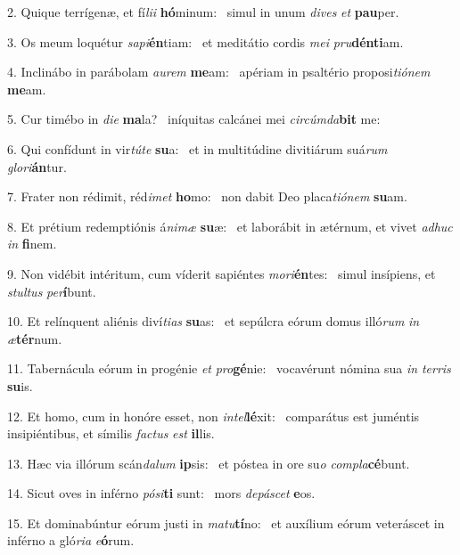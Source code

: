 2. Quique terrígenæ, et fí\textit{li}\textit{i} \textbf{hó}minum: \ast\  simul in unum \textit{di}\textit{ves} \textit{et} \textbf{pau}per.\

3. Os meum loquétur \textit{sa}\textit{pi}\textbf{én}tiam: \ast\  et meditátio cordis \textit{me}\textit{i} \textit{pru}\textbf{dén}\textbf{ti}am.\

4. Inclinábo in parábolam \textit{au}\textit{rem} \textbf{me}am: \ast\  apériam in psaltério proposi\textit{ti}\textit{ó}\textit{nem} \textbf{me}am.\

5. Cur timébo in \textit{di}\textit{e} \textbf{ma}la? \ast\  iníquitas calcánei mei \textit{cir}\textit{cúm}\textit{da}\textbf{bit} me:\

6. Qui confídunt in vir\textit{tú}\textit{te} \textbf{su}a: \ast\  et in multitúdine divitiárum suá\textit{rum} \textit{glo}\textit{ri}\textbf{án}tur.\

7. Frater non rédimit, réd\textit{i}\textit{met} \textbf{ho}mo: \ast\  non dabit Deo placa\textit{ti}\textit{ó}\textit{nem} \textbf{su}am.\

8. Et prétium redemptiónis á\textit{ni}\textit{mæ} \textbf{su}æ: \ast\  et laborábit in ætérnum, et vivet \textit{ad}\textit{huc} \textit{in} \textbf{fi}nem.\

9. Non vidébit intéritum, cum víderit sapiéntes \textit{mo}\textit{ri}\textbf{én}tes: \ast\  simul insípiens, et \textit{stul}\textit{tus} \textit{per}\textbf{í}bunt.\

10. Et relínquent aliénis diví\textit{ti}\textit{as} \textbf{su}as: \ast\  et sepúlcra eórum domus illó\textit{rum} \textit{in} \textit{æ}\textbf{tér}num.\

11. Tabernácula eórum in progénie \textit{et} \textit{pro}\textbf{gé}nie: \ast\  vocavérunt nómina sua \textit{in} \textit{ter}\textit{ris} \textbf{su}is.\

12. Et homo, cum in honóre esset, non \textit{in}\textit{tel}\textbf{lé}xit: \ast\  comparátus est juméntis insipiéntibus, et símilis \textit{fac}\textit{tus} \textit{est} \textbf{il}lis.\

13. Hæc via illórum scán\textit{da}\textit{lum} \textbf{ip}sis: \ast\  et póstea in ore su\textit{o} \textit{com}\textit{pla}\textbf{cé}bunt.\

14. Sicut oves in inférno \textit{pó}\textit{si}\textbf{ti} sunt: \ast\  mors \textit{de}\textit{pá}\textit{scet} \textbf{e}os.\

15. Et dominabúntur eórum justi in \textit{ma}\textit{tu}\textbf{tí}no: \ast\  et auxílium eórum veteráscet in inférno a gló\textit{ri}\textit{a} \textit{e}\textbf{ó}rum.\

